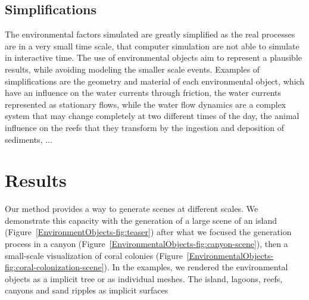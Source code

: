 \subsection{Simplifications}
\label{EnvironmentObjects-sec:simplifications}
The environmental factors simulated are greatly simplified as the real processes are in a very small time scale, that computer simulation are not able to simulate in interactive time. The use of environmental objects aim to represent a plausible results, while avoiding modeling the smaller scale events. Examples of simplifications are the geometry and material of each environmental object, which have an influence on the water currents through friction, the water currents represented as stationary flows, while the water flow dynamics are a complex system that may change completely at two different times of the day, the animal influence on the reefs that they transform by the ingestion and deposition of sediments, ...


\section{Results}
\label{EnvironmentObjects-sec:results}
Our method provides a way to generate scenes at different scales. We demonstrate this capacity with the generation of a large scene of an island (Figure~\ref{EnvironmentObjects-fig:teaser}) after what we focused the generation process in a canyon (Figure~\ref{EnvironmentalObjects-fig:canyon-scene}), then a small-scale visualization of coral colonies (Figure~\ref{EnvironmentalObjects-fig:coral-colonization-scene}).
In the examples, we rendered the environmental objects as a implicit tree or as individual meshes. The island, lagoons, reefs, canyons and sand ripples as implicit surfaces

